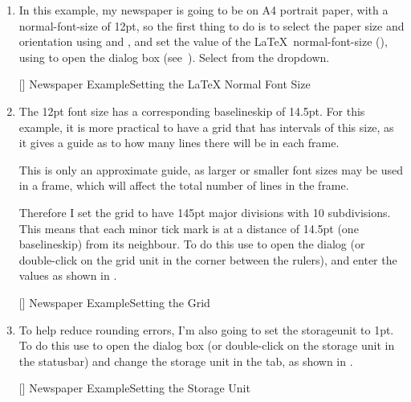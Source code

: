 \begin{enumerate}
\item In this example, my newspaper is going to be on A4 portrait
paper, with a \gls{normal-font-size} of 12\gls{pt}, so the first
thing to do is to select the paper size and orientation using
 and
, and set the value of the
\LaTeX\ \gls{normal-font-size} (), using
 to open the  dialog box
(see~). Select  from the
\gls{dropdown}.

[]
{}
{Newspaper Example\dash Setting the \LaTeX{} Normal Font Size}

\item The 12\gls{pt} font size has a corresponding \gls{baselineskip}
of 14.5\gls{pt}. For this example, it is more practical to have a grid
that has intervals of this size, as it gives a guide as to how many
lines there will be in each frame.

\begin{information}
This is only an approximate guide, as larger or smaller font sizes may be
used in a frame, which will affect the total number of lines in the
frame. 
\end{information}

Therefore I set the grid to have 145\gls{pt} major divisions with
10 subdivisions. This means that each minor tick mark is at a distance
of 14.5pt (one \gls{baselineskip}) from its neighbour. To do this
use  to open the  dialog
(or double-click on the grid unit in the corner between the
\glspl{ruler}), and enter the values as shown in .

[]
{}
{Newspaper Example\dash Setting the Grid}

\item To help reduce rounding errors, I'm also going to set the
\gls{storageunit} to 1pt. To do this use  to
open the  dialog box (or double-click on the storage
unit in the \gls{statusbar}) and change the storage unit in
the  tab, as shown in
.

[]
{}
{Newspaper Example\dash Setting the Storage Unit}


\end{enumerate}
